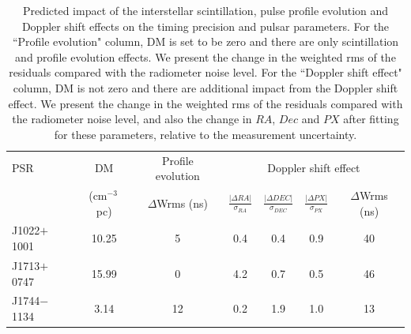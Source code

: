 \documentclass[useAMS,usenatbib]{mn2e}
\begin{document}
\begin{table}
\begin{center}
\caption{Predicted impact of the interstellar scintillation, pulse profile evolution and 
Doppler shift effects on the timing precision and pulsar parameters. 
For the ``Profile evolution" column, DM is set to be zero and there are only scintillation 
and profile evolution effects. We present the change in the weighted rms of the residuals compared 
with the radiometer noise level.
For the ``Doppler shift effect" column, DM is not zero and there are additional impact from the 
Doppler shift effect. We present the change in the weighted rms of the residuals 
compared with the radiometer noise level, and also the change in $RA$, $Dec$ and $PX$ after fitting
for these parameters, relative to the measurement uncertainty.} 
\label{rms}
\begin{tabular}{lcc|cccc}
\hline
PSR              & DM              & Profile evolution & \multicolumn{4}{c}{Doppler shift effect} \\
                 & (cm$^{-3}$\,pc) & $\Delta$Wrms (ns) & $\frac{|\Delta RA|}{\sigma_{RA}}$ & $\frac{|\Delta DEC|}{\sigma_{DEC}}$ & $\frac{|\Delta PX|}{\sigma_{PX}}$ & $\Delta$Wrms (ns)\\
\hline                                                                                       
J1022$+$1001   & 10.25   & 5       & 0.4 & 0.4 & 0.9 & 40     \\
J1713$+$0747   & 15.99   & 0       & 4.2 & 0.7 & 0.5 & 46     \\
J1744$-$1134   & 3.14    & 12      & 0.2 & 1.9 & 1.0 & 13     \\

\end{tabular}
\end{center}
\end{table}
\end{document}
